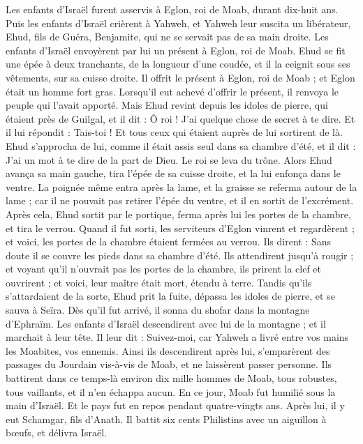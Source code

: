 \begin{multicols}{2}
Les enfants d'Israël furent asservis à Eglon, roi de Moab, durant dix-huit ans.
Puis les enfants d'Israël crièrent à Yahweh, et Yahweh leur suscita un libérateur, Ehud, fils de Guéra, Benjamite, qui ne se servait pas de sa main droite. Les enfants d'Israël envoyèrent par lui un présent à Eglon, roi de Moab.
Ehud se fit une épée à deux tranchants, de la longueur d'une coudée, et il la ceignit sous ses vêtements, sur sa cuisse droite.
Il offrit le présent à Eglon, roi de Moab ; et Eglon était un homme fort gras.
Lorsqu’il eut achevé d’offrir le présent, il renvoya le peuple qui l’avait apporté.
Mais Ehud revint depuis les idoles de pierre, qui étaient près de Guilgal, et il dit : Ô roi ! J’ai quelque chose de secret à te dire. Et il lui répondit : Tais-toi ! Et tous ceux qui étaient auprès de lui sortirent de là.
Ehud s'approcha de lui, comme il était assis seul dans sa chambre d'été, et il dit : J'ai un mot à te dire de la part de Dieu. Le roi se leva du trône.
Alors Ehud avança sa main gauche, tira l'épée de sa cuisse droite, et la lui enfonça dans le ventre.
La poignée même entra après la lame, et la graisse se referma autour de la lame ; car il ne pouvait pas retirer l'épée du ventre, et il en sortit de l’excrément.
Après cela, Ehud sortit par le portique, ferma après lui les portes de la chambre, et tira le verrou.
Quand il fut sorti, les serviteurs d'Eglon vinrent et regardèrent ; et voici, les portes de la chambre étaient fermées au verrou. Ils dirent : Sans doute il se couvre les pieds dans sa chambre d’été.
Ils attendirent jusqu’à rougir ; et voyant qu'il n'ouvrait pas les portes de la chambre, ils prirent la clef et ouvrirent ; et voici, leur maître était mort, étendu à terre.
Tandis qu’ils s’attardaient de la sorte, Ehud prit la fuite, dépassa les idoles de pierre, et se sauva à Seïra.
Dès qu’il fut arrivé, il sonna du shofar dans la montagne d'Ephraïm. Les enfants d'Israël descendirent avec lui de la montagne ; et il marchait à leur tête.
Il leur dit : Suivez-moi, car Yahweh a livré entre vos mains les Moabites, vos ennemis. Ainsi ils descendirent après lui, s’emparèrent des passages du Jourdain vis-à-vis de Moab, et ne laissèrent passer personne.
Ils battirent dans ce temps-là environ dix mille hommes de Moab, tous robustes, tous vaillants, et il n'en échappa aucun.
En ce jour, Moab fut humilié sous la main d'Israël. Et le pays fut en repos pendant quatre-vingts ans.
Après lui, il y eut  Schamgar, fils d'Anath. Il battit six cents Philistins avec un aiguillon à bœufs, et délivra Israël.

\end{multicols}
